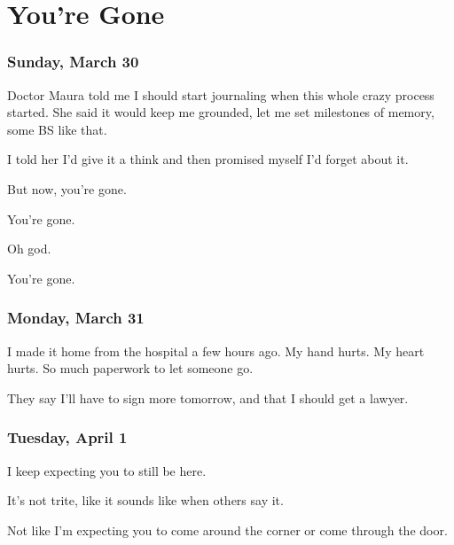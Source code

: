 \hypertarget{youre-gone}{%
\chapter{You're Gone}\label{youre-gone}}

{
\setlength{\parindent}{0cm}
\setlength{\parskip}{5pt}

\subsection*{Sunday, March 30}\label{sunday-march-30}

Doctor Maura told me I should start
journaling when this whole crazy process started. She said it would keep
me grounded, let me set milestones of memory, some BS like that.

I told her I'd give it a think and
then promised myself I'd forget about it.

But now, you're gone.

You're gone.

Oh god.

You're gone.

\newpage

\subsection*{Monday, March 31}\label{monday-march-31}

I made it home from the hospital a
few hours ago. My hand hurts. My heart hurts. So much paperwork to let
someone go.

They say I'll have to sign more
tomorrow, and that I should get a lawyer.

\newpage

\subsection*{Tuesday, April 1}\label{tuesday-april-1}

I keep expecting you to still be
here.

It's not trite, like it sounds like
when others say it.

Not like I'm expecting you to come
around the corner or come through the door.

}
